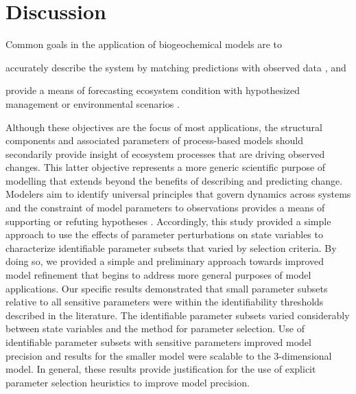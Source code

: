 \documentclass[preprint]{elsarticle}\usepackage[]{graphicx}\usepackage[]{color}
\begin{document}
\section{Discussion}

Common goals in the application of biogeochemical models are to \begin{inparaenum}[1\upshape)]
\item accurately describe the system by matching predictions with observed data \citep{Reckhow90}, and 
\item provide a means of forecasting ecosystem condition with hypothesized management or environmental scenarios \citep{Clark01}. 
\end{inparaenum}
Although these objectives are the focus of most applications, the structural components and associated parameters of process-based models should secondarily provide insight of ecosystem processes that are driving observed changes.  This latter objective represents a more generic scientific purpose of modelling that extends beyond the benefits of describing and predicting change.  Modelers aim to identify universal principles that govern dynamics across systems and the constraint of model parameters to observations provides a means of supporting or refuting hypotheses \citep{Hilborn97,Kirchner06}.  Accordingly, this study provided a simple approach to use the effects of parameter perturbations on state variables to characterize identifiable parameter subsets that varied by selection criteria.  By doing so, we provided a simple and preliminary approach towards improved model refinement that begins to address more general purposes of model applications. Our specific results demonstrated that small parameter subsets relative to all sensitive parameters were within the identifiability thresholds described in the literature.  The identifiable parameter subsets varied considerably between state variables and the method for parameter selection.  Use of identifiable parameter subsets with sensitive parameters improved model precision and results for the smaller model were scalable to the 3-dimensional model.  In general, these results provide justification for the use of explicit parameter selection heuristics to improve model precision.
\end{document}
